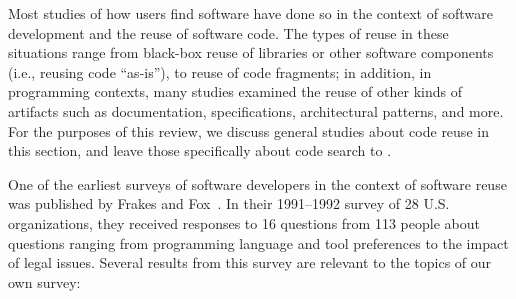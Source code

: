 \documentclass{casicswhitepaper}
\begin{document}

Most studies of how users find software have done so in the context of software development and the reuse of software code.  The types of reuse in these situations range from black-box reuse of libraries or other software components (i.e., reusing code ``as-is''), to reuse of code fragments; in addition, in programming contexts, many studies examined the reuse of other kinds of artifacts such as documentation, specifications, architectural patterns, and more.  For the purposes of this review, we discuss general studies about code reuse in this section, and leave those specifically about code search to .

One of the earliest surveys of software developers in the context of software reuse was published by Frakes and Fox~\cite{frakes1995sixteen}.  In their 1991--1992 survey of 28 U.S. organizations, they received responses to 16 questions from 113 people about questions ranging from programming language and tool preferences to the impact of legal issues.  Several results from this survey are relevant to the topics of our own survey:
\end{document}
